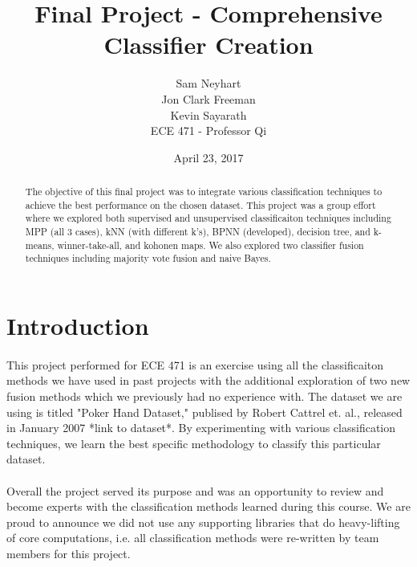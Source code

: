 \documentclass{article}
\begin{document}
\title{Final Project - Comprehensive Classifier Creation}
\author{Sam Neyhart\\ Jon Clark Freeman\\ Kevin Sayarath\\ ECE 471 - Professor Qi}
\date{April 23, 2017}
\maketitle
\newpage

\begin{abstract}
The objective of this final project was to integrate various classification
techniques to achieve the best performance on the chosen dataset. This project
was a group effort where we explored both supervised and unsupervised
classificaiton techniques including MPP (all 3 cases), kNN (with different k's),
BPNN (developed), decision tree, and k-means, winner-take-all, and kohonen maps.
We also explored two classifier fusion techniques including majority vote fusion
and naive Bayes.
\end{abstract}
\newpage


\section*{Introduction}
\paragraph{}
This project performed for ECE 471 is an exercise using all the classificaiton methods
we have used in past projects with the additional exploration of two new fusion methods
which we previously had no experience with.  The dataset we are using is titled "Poker
Hand Dataset," publised by Robert Cattrel et. al., released in January 2007 *link to
dataset*.  By experimenting with various classification techniques, we learn the best
specific methodology to classify this particular dataset.
\paragraph{}
Overall the project served its purpose and was an opportunity to review and become experts
with the classification methods learned during this course.  We are proud to announce we
did not use any supporting libraries that do heavy-lifting of core computations, i.e. all
classification methods were re-written by team members for this project.
\end{document}
